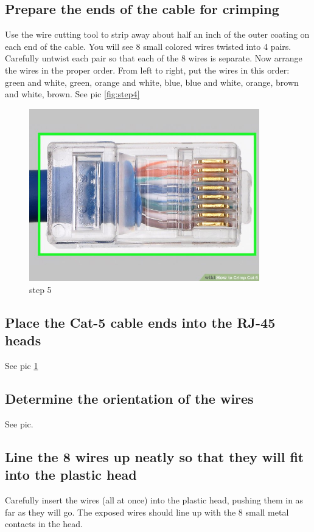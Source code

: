 \documentclass[a4paper,12pt]{book}
\begin{document}
\subsection{Prepare the ends of the cable for crimping}
Use the wire cutting tool to strip away about half an inch of the outer coating on each end of the cable. You will see 8 small colored wires twisted into 4 pairs. Carefully untwist each pair so that each of the 8 wires is separate. Now arrange the wires in the proper order. From left to right, put the wires in this order: green and white, green, orange and white, blue, blue and white, orange, brown and white, brown. See pic \ref{fig:step4}
\clearpage 

\begin{figure}
\centering
\includegraphics[width= 10cm]{./step5.JPG}
\caption{step 5}\label{fig:step5}
\end{figure}

\subsection{Place the Cat-5 cable ends into the RJ-45 heads}
See pic \ref{fig:step5}

\subsection{Determine the orientation of the wires}
See pic.

\subsection{Line the 8 wires up neatly so that they will fit into the plastic head}
Carefully insert the wires (all at once) into the plastic head, pushing them in as far as they will go. The exposed wires should line up with the 8 small metal contacts in the head.
\end{document}
